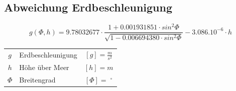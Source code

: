 	\subsection{Abweichung Erdbeschleunigung}

		$$ \boxed{ g(\varPhi , h) = 9.78032677 \cdot \frac{1 + 0.001931851 \cdot sin^2 \varPhi}{\sqrt{1 - 0.006694380 \cdot sin^2 \varPhi}} - 3.086.10^{-6} \cdot h }$$ 

		\begin{tabular}{c l c}
			$g$ & Erdbeschleunigung & $[g] = \frac{m}{s^2}$ \\
			$h$ & Höhe über Meer & $[h] = m$ \\
			$\varPhi$ & Breitengrad & $[\varPhi] =  \; ^\circ$ \\
		\end{tabular}

	\vfill\null
	\pagebreak
		